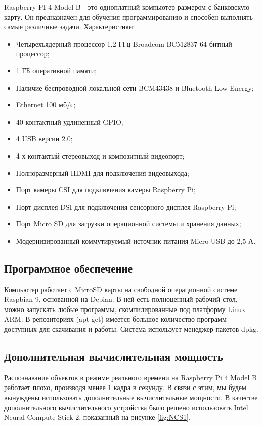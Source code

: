 \documentclass[14pt,a4paper]{scrartcl}
\begin{document}
		Raspberry PI 4 Model B - это одноплатный компьютер размером с банковскую карту. Он предназначен для обучения программированию и способен выполнять самые различные задачи\cite{bib:Raspberry_PI_Product_Page}.
		\newline \newline
		Характеристики:
		\begin{itemize}
			\item Четырехъядерный процессор 1,2 ГГц Broadcom BCM2837 64-битный процессор;
			\item 1 ГБ оперативной памяти;
			\item Наличие беспроводной локальной сети BCM43438 и Bluetooth Low Energy;
			\item Ethernet 100 мб/с;
			\item 40-контактный удлиненный GPIO;
			\item 4 USB версии 2.0;
			\item 4-х контактый стереовыход и композитный видеопорт;
			\item Полноразмерный HDMI для подключения видеовыхода;
			\item Порт камеры CSI для подключения камеры Raspberry Pi;
			\item Порт дисплея DSI для подключения сенсорного дисплея Raspberry Pi;
			\item Порт Micro SD для загрузки операционной системы и хранения данных;
			\item Модернизированный коммутируемый источник питания Micro USB до 2,5 А.
		\end{itemize}
	
	\subsection{Программное обеспечение}
	
		Компьютер работает с MicroSD карты на свободной операционной системе Raspbian 9, основанной на Debian. В ней есть полноценный рабочий стол, можно запускать любые программы, скомпилированные под платформу Linux ARM. В репозиториях (apt-get) имеется большое количество программ доступных для скачивания и работы. Система использует менеджер пакетов dpkg\cite{bib:Raspbian_Specs}.
	
	\subsection{Дополнительная вычислительная мощность}
	
		Распознавание объектов в режиме реального времени на Raspberry Pi 4 Model B работает плохо, производя менее 1 кадра в секунду\cite{bib:Raspberry_Face_Recognition}. В связи с этим, мы будем вынуждены использовать дополнительные вычислительные мощности. В качестве дополнительного вычислительного устройства было решено использовать Intel Neural Compute Stick 2, показанный на рисунке \ref{fig:NCS1}. 
		
\end{document}
